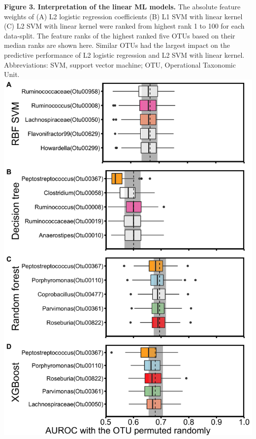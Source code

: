 \documentclass[11pt,]{article}
\begin{document}
\textbf{Figure 3. Interpretation of the linear ML models.} The absolute
feature weights of (A) L2 logistic regression coefficients (B) L1 SVM
with linear kernel (C) L2 SVM with linear kernel were ranked from
highest rank 1 to 100 for each data-split. The feature ranks of the
highest ranked five OTUs based on their median ranks are shown here.
Similar OTUs had the largest impact on the predictive performance of L2
logistic regression and L2 SVM with linear kernel. Abbreviations: SVM,
support vector machine; OTU, Operational Taxonomic Unit. \newpage
\includegraphics{Figure_4.png}
\end{document}
